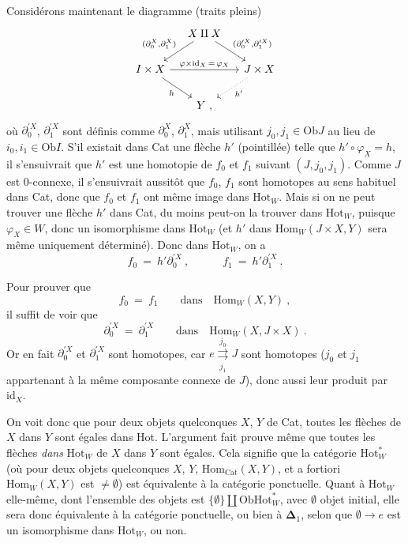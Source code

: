 \documentclass[11pt]{article}
\newcommand{\msp}[1]{\marginpar{\raggedright\footnotesize [#1]}}
\newcommand{\Ob}{\mathrm{Ob}}
\newcommand{\Cat}{\mathrm{Cat}}
\newcommand{\id}{\mathrm{id}}
\newcommand{\Hot}{\mathrm{Hot}}
\newcommand{\Hom}{\mathrm{Hom}}
\begin{document}
\msp{page 128}Considérons maintenant le diagramme (traits pleins)
\[
\begin{tikzcd}[column sep=small]
& X\amalg X \arrow[dl, "{(\partial_0^X,\partial_1^X)}"'] \arrow[dr, "{(\partial_0^{\prime X},\partial_1^{\prime X})}"] & \\
I\times X \arrow[rr, "\varphi\times\id_X\,=\,\varphi_X"] \arrow[dr, "h"'] & & J\times X \arrow[dl, dotted, "h'"] \\
& Y\ , &
\end{tikzcd}
\]
où $\partial_0^{\prime X}$, $\partial_1^{\prime X}$ sont définis comme $\partial_0^X$, $\partial_1^X$, mais utilisant $j_0,j_1\in\Ob J$ au lieu de $i_0,i_1\in\Ob I$. S'il existait dans Cat une flèche $h'$ (pointillée) telle que $h'\circ\varphi_X=h$, il s'ensuivrait que $h'$ est une homotopie de $f_0$ et $f_1$ suivant $(J,j_0,j_1)$. Comme $J$ est 0-connexe, il s'ensuivrait aussitôt que $f_0$, $f_1$ sont homotopes au sens habituel dans Cat, donc que $f_0$ et $f_1$ ont même image dans $\Hot_W$. Mais si on ne peut trouver une flèche $h'$ dans Cat, du moins peut-on la trouver dans $\Hot_W$, puisque $\varphi_X\in W$, donc un isomorphisme dans $\Hot_W$ (et $h'$ dans $\Hom_W(J\times X,Y)$ sera même uniquement déterminé). Donc dans $\Hot_W$, on a
\[
f_0\ =\ h'\partial_0^{\prime X}\ ,\qquad\quad f_1\ =\ h'\partial_1^{\prime X}\ .
\]

\msp{page 129}Pour prouver que
\[
f_0\ =\ f_1\qquad\text{dans}\quad\Hom_W(X,Y)\ ,
\]
il suffit de voir que
\[
\partial_0^{\prime X}\ =\ \partial_1^{\prime X}\qquad\text{dans}\quad\Hom_W(X,J\times X)\ .
\]
Or en fait $\partial_0^{\prime X}$ et $\partial_1^{\prime X}$ sont homotopes, car $e\underset{j_1}{\overset{j_0}{\rightrightarrows}}J$ sont homotopes ($j_0$ et $j_1$ appartenant à la même composante connexe de $J$), donc aussi leur produit par $\id_X$.

On voit donc que pour deux objets quelconques $X$, $Y$ de Cat, toutes les flèches de $X$ dans $Y$ sont égales dans Hot. L'argument fait prouve même que toutes les flèches \textit{dans} $\Hot_W$ de $X$ dans $Y$ sont égales. Cela signifie que la catégorie $\Hot_W^*$ (où pour deux objets quelconques $X$, $Y$, $\Hom_{\Cat}(X,Y)$, et a fortiori $\Hom_W(X,Y)$ est $\neq\emptyset$) est équivalente à la catégorie ponctuelle. Quant à $\Hot_W$ elle-même, dont l'ensemble des objets est $\{\emptyset\}\amalg\Ob\Hot_W^*$, avec $\emptyset$ objet initial, elle sera donc équivalente à la catégorie ponctuelle, ou bien à $\boldsymbol{\Delta}_1$, selon que $\emptyset\longrightarrow e$ est un isomorphisme dans $\Hot_W$, ou non.
\end{document}
